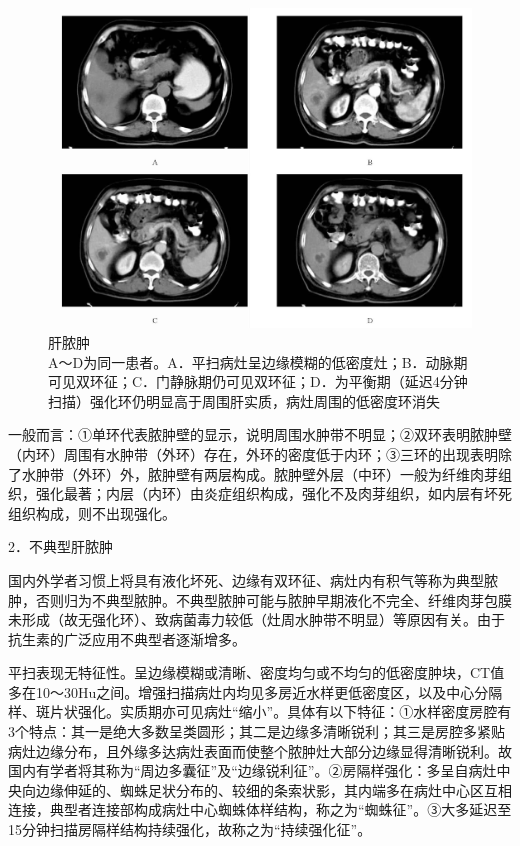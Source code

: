 \begin{figure}[!htbp]
 \centering
 \includegraphics[width=.7\textwidth,height=\textheight,keepaspectratio]{./images/Image00283.jpg}
 \captionsetup{justification=centering}
 \caption{肝脓肿\\{\small A～D为同一患者。A．平扫病灶呈边缘模糊的低密度灶；B．动脉期可见双环征；C．门静脉期仍可见双环征；D．为平衡期（延迟4分钟扫描）强化环仍明显高于周围肝实质，病灶周围的低密度环消失}}
 \label{fig11-11}
  \end{figure} 

一般而言：①单环代表脓肿壁的显示，说明周围水肿带不明显；②双环表明脓肿壁（内环）周围有水肿带（外环）存在，外环的密度低于内环；③三环的出现表明除了水肿带（外环）外，脓肿壁有两层构成。脓肿壁外层（中环）一般为纤维肉芽组织，强化最著；内层（内环）由炎症组织构成，强化不及肉芽组织，如内层有坏死组织构成，则不出现强化。

2．不典型肝脓肿

国内外学者习惯上将具有液化坏死、边缘有双环征、病灶内有积气等称为典型脓肿，否则归为不典型脓肿。不典型脓肿可能与脓肿早期液化不完全、纤维肉芽包膜未形成（故无强化环）、致病菌毒力较低（灶周水肿带不明显）等原因有关。由于抗生素的广泛应用不典型者逐渐增多。

平扫表现无特征性。呈边缘模糊或清晰、密度均匀或不均匀的低密度肿块，CT值多在10～30Hu之间。增强扫描病灶内均见多房近水样更低密度区，以及中心分隔样、斑片状强化。实质期亦可见病灶“缩小”。具体有以下特征：①水样密度房腔有3个特点：其一是绝大多数呈类圆形；其二是边缘多清晰锐利；其三是房腔多紧贴病灶边缘分布，且外缘多达病灶表面而使整个脓肿灶大部分边缘显得清晰锐利。故国内有学者将其称为“周边多囊征”及“边缘锐利征”。②房隔样强化：多呈自病灶中央向边缘伸延的、蜘蛛足状分布的、较细的条索状影，其内端多在病灶中心区互相连接，典型者连接部构成病灶中心蜘蛛体样结构，称之为“蜘蛛征”。③大多延迟至15分钟扫描房隔样结构持续强化，故称之为“持续强化征”。

